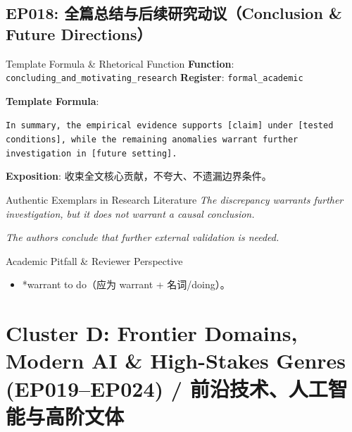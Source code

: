 \subsection{EP018: 全篇总结与后续研究动议（Conclusion \& Future Directions）}\label{sec:ep:EP018}
\begin{ConceptBox}{Template Formula \& Rhetorical Function}
\textbf{Function}: \texttt{concluding\_and\_motivating\_research} \quad \textbf{Register}: \texttt{formal\_academic}\par\vspace{3pt}
\textbf{Template Formula}:\par\noindent\texttt{In summary, the empirical evidence supports [claim] under [tested conditions], while the remaining anomalies warrant further investigation in [future setting].}\par\vspace{4pt}
\textbf{Exposition}: 收束全文核心贡献，不夸大、不遗漏边界条件。
\end{ConceptBox}
\begin{ExampleBox}{Authentic Exemplars in Research Literature}
\textit{The discrepancy warrants further investigation, but it does not warrant a causal conclusion.}\par\vspace{2pt}
\textit{The authors conclude that further external validation is needed.}\par\vspace{2pt}
\end{ExampleBox}
\begin{TipBox}{Academic Pitfall \& Reviewer Perspective}
\begin{itemize}[leftmargin=1.5em, itemsep=1pt]
  \item *warrant to do（应为 warrant + 名词/doing）。
\end{itemize}
\end{TipBox}
\vspace{6pt}
\section{Cluster D: Frontier Domains, Modern AI \& High-Stakes Genres (EP019--EP024) / 前沿技术、人工智能与高阶文体}
